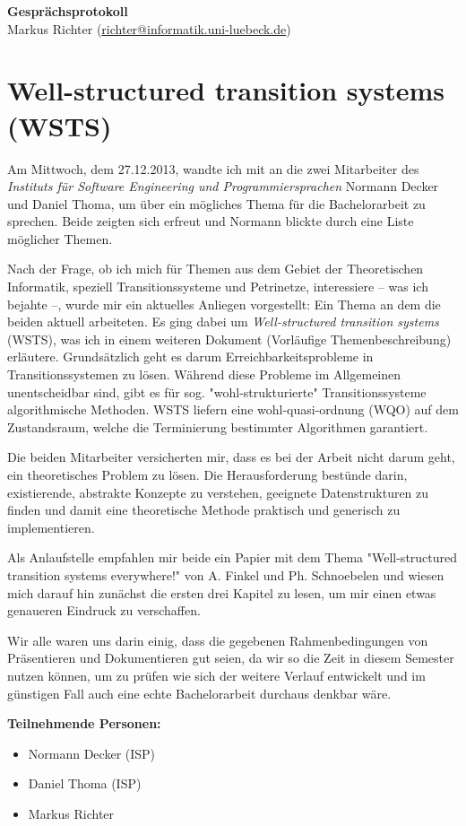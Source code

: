 \documentclass[
  a4paper,               %
  twoside,               %
  headings=small,        %
  DIV=12,                %
  BCOR=1cm,              %
  headinclude=true,      %
  footinclude=true,      %
  numbers=noenddot,      %
  11pt]{scrartcl}        %
\begin{document}
\begin{center}
\textbf{\huge Gesprächsprotokoll} \\[1em]
Markus Richter (\url{richter@informatik.uni-luebeck.de})
\end{center}


\section*{Well-structured transition systems (WSTS)}
Am Mittwoch, dem 27.12.2013, wandte ich mit an die zwei Mitarbeiter des \emph{Instituts für Software Engineering und Programmiersprachen} Normann Decker und Daniel Thoma, um über ein mögliches Thema für die Bachelorarbeit zu sprechen. Beide zeigten sich erfreut und Normann blickte durch eine Liste möglicher Themen. 

Nach der Frage, ob ich mich für Themen aus dem Gebiet der Theoretischen Informatik, speziell Transitionssysteme und Petrinetze, interessiere -- was ich bejahte --, wurde mir ein aktuelles Anliegen vorgestellt: Ein Thema an dem die beiden aktuell arbeiteten. Es ging dabei um \emph{Well-structured transition systems} (WSTS), was ich in einem weiteren Dokument (Vorläufige Themenbeschreibung) erläutere. Grundsätzlich geht es darum Erreichbarkeitsprobleme in Transitionssystemen zu lösen. Während diese Probleme im Allgemeinen unentscheidbar sind, gibt es für sog. "wohl-strukturierte" Transitionssysteme algorithmische Methoden. WSTS liefern eine wohl-quasi-ordnung (WQO) auf dem Zustandsraum, welche die Terminierung bestimmter Algorithmen garantiert.

Die beiden Mitarbeiter versicherten mir, dass es bei der Arbeit nicht darum geht, ein theoretisches Problem zu lösen. Die Herausforderung bestünde darin, existierende, abstrakte Konzepte zu verstehen, geeignete Datenstrukturen zu finden und damit eine theoretische Methode praktisch und generisch zu implementieren.

Als Anlaufstelle empfahlen mir beide ein Papier mit dem Thema "Well-structured transition systems everywhere!" von A. Finkel und Ph. Schnoebelen und wiesen mich darauf hin zunächst die ersten drei Kapitel zu lesen, um mir einen etwas genaueren Eindruck zu verschaffen.

Wir alle waren uns darin einig, dass die gegebenen Rahmenbedingungen von Präsentieren und Dokumentieren gut seien, da wir so die Zeit in diesem Semester nutzen können, um zu prüfen wie sich der weitere Verlauf entwickelt und im günstigen Fall auch eine echte Bachelorarbeit durchaus denkbar wäre. \bigskip

\textbf{Teilnehmende Personen:}\smallskip

\begin{itemize}
\item Normann Decker (ISP)
\item Daniel Thoma (ISP)
\item Markus Richter
\end{itemize}
\end{document}
